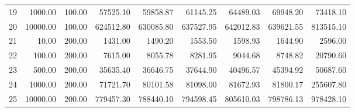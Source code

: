 \begin{table}[ht]
\begin{tabular}{rrrrrrrrr}
  19 & 1000.00 & 100.00 & 57525.10 & 59858.87 & 61145.25 & 64489.03 & 69948.20 & 73418.10 \\ 
  20 & 10000.00 & 100.00 & 624512.80 & 630085.80 & 637527.95 & 642012.83 & 639621.55 & 813515.10 \\ 
  21 & 10.00 & 200.00 & 1431.00 & 1490.20 & 1553.50 & 1598.93 & 1644.90 & 2596.00 \\ 
  22 & 100.00 & 200.00 & 7615.00 & 8055.78 & 8281.95 & 9044.68 & 8748.82 & 20790.60 \\ 
  23 & 500.00 & 200.00 & 35635.40 & 36646.75 & 37644.90 & 40496.57 & 45394.92 & 50687.60 \\ 
  24 & 1000.00 & 200.00 & 71721.70 & 80101.58 & 81098.00 & 81672.93 & 81800.17 & 255607.80 \\ 
  25 & 10000.00 & 200.00 & 779457.30 & 788440.10 & 794598.45 & 805610.03 & 798786.13 & 978428.10 \\ 
   \hline
\end{tabular}
\end{table}
